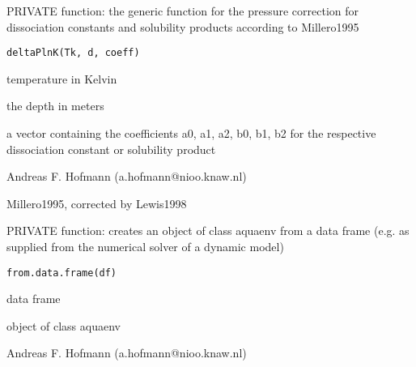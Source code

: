 \documentclass{article}
\begin{document}
\begin{Description}\relax
PRIVATE function: the generic function for the pressure correction for dissociation constants and solubility products according to Millero1995
\end{Description}
\begin{Usage}
\begin{verbatim}deltaPlnK(Tk, d, coeff)\end{verbatim}
\end{Usage}
\begin{Arguments}
\begin{ldescription}
\item[\code{Tk }] temperature in Kelvin
\item[\code{d }] the depth in meters
\item[\code{coeff }] a vector containing the coefficients a0, a1, a2, b0, b1, b2 for the respective dissociation constant or solubility product
\end{ldescription}
\end{Arguments}
\begin{Author}\relax
Andreas F. Hofmann (a.hofmann@nioo.knaw.nl)
\end{Author}
\begin{References}\relax
Millero1995, corrected by Lewis1998
\end{References}

\begin{Description}\relax
PRIVATE function: creates an object of class aquaenv from a data frame (e.g. as supplied from the numerical solver of a dynamic model)
\end{Description}
\begin{Usage}
\begin{verbatim}from.data.frame(df)\end{verbatim}
\end{Usage}
\begin{Arguments}
\begin{ldescription}
\item[\code{df }] data frame
\end{ldescription}
\end{Arguments}
\begin{Value}
object of class aquaenv
\end{Value}
\begin{Author}\relax
Andreas F. Hofmann (a.hofmann@nioo.knaw.nl)
\end{Author}
\end{document}
